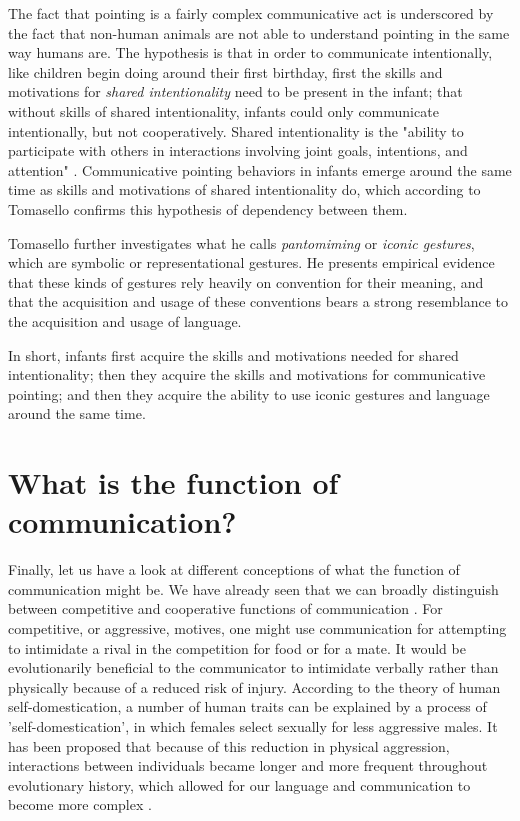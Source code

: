 The fact that pointing is a fairly complex communicative act is underscored by the fact that non-human animals are not able to understand pointing in the same way humans are. 
The hypothesis is that in order to communicate intentionally, like children begin doing around their first birthday, first the skills and motivations for \emph{shared intentionality} need to be present in the infant; that without skills of shared intentionality, infants could only communicate intentionally, but not cooperatively.
Shared intentionality is the "ability to participate with others in interactions involving joint goals, intentions, and attention" \citep[p.~139]{Tomasello08-origins}. Communicative pointing behaviors in infants emerge around the same time as skills and motivations of shared intentionality do, which according to Tomasello confirms this hypothesis of dependency between them.

Tomasello further investigates what he calls \emph{pantomiming} or \emph{iconic gestures}, which are symbolic or representational gestures. 
He presents empirical evidence that these kinds of gestures rely heavily on convention for their meaning, and that the acquisition and usage of these conventions bears a strong resemblance to the acquisition and usage of language.

In short, infants first acquire the skills and motivations needed for shared intentionality; then they acquire the skills and motivations for communicative pointing; and then they acquire the ability to use iconic gestures and language around the same time.

\section{What is the function of communication?}
\label{sec:comm:function}

Finally, let us have a look at different conceptions of what the function of communication might be. We have already seen that we can broadly distinguish between competitive and cooperative functions of communication \citep{SeyfarthCheney03}.
For competitive, or aggressive, motives, one might use communication for attempting to intimidate a rival in the competition for food or for a mate. It would be evolutionarily beneficial to the communicator to intimidate verbally rather than physically because of a reduced risk of injury.
According to the theory of human self-domestication, a number of human traits can be explained by a process of 'self-domestication', in which females select sexually for less aggressive males. It has been proposed that because of this reduction in physical aggression, interactions between individuals became longer and more frequent throughout evolutionary history, which allowed for our language and communication to become more complex \citep{Benitez21}.

